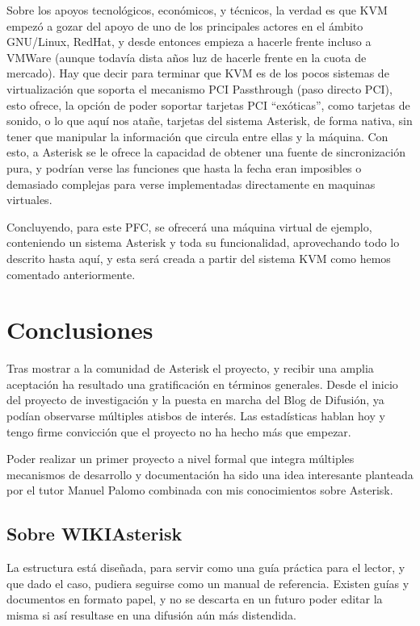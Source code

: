 Sobre los apoyos tecnológicos, económicos, y técnicos, la verdad es que KVM empezó a gozar del apoyo de uno de los principales actores en el ámbito GNU/Linux, RedHat, y desde entonces empieza a hacerle frente incluso a VMWare (aunque todavía dista años luz de hacerle frente en la cuota de mercado). Hay que decir para terminar que KVM es de los pocos sistemas de virtualización que soporta el mecanismo PCI Passthrough (paso directo PCI), esto ofrece, la opción de poder soportar tarjetas PCI “exóticas”, como tarjetas de sonido, o lo que aquí nos atañe, tarjetas del sistema Asterisk, de forma nativa, sin tener que manipular la información que circula entre ellas y la máquina. Con esto, a Asterisk se le ofrece la capacidad de obtener una fuente de sincronización pura, y podrían verse las funciones que hasta la fecha eran imposibles o demasiado complejas para verse implementadas directamente en maquinas virtuales.

Concluyendo, para este PFC, se ofrecerá una máquina virtual de ejemplo, conteniendo un sistema Asterisk y toda su funcionalidad, aprovechando todo lo descrito hasta aquí, y esta será creada a partir del sistema KVM como hemos comentado anteriormente.

\section{Conclusiones}

Tras mostrar a la comunidad de Asterisk el proyecto, y recibir una amplia aceptación ha resultado una gratificación en términos generales. Desde el inicio del proyecto de investigación y la puesta en marcha del Blog de Difusión, ya podían observarse múltiples atisbos de interés. Las estadísticas hablan hoy y tengo firme convicción que el proyecto no ha hecho más que empezar.

Poder realizar un primer proyecto a nivel formal que integra múltiples mecanismos de desarrollo y documentación ha sido una idea interesante planteada por el tutor Manuel Palomo combinada con mis conocimientos sobre Asterisk.

\subsection{Sobre WIKIAsterisk}

La estructura está diseñada, para servir como una guía práctica para el lector, y que dado el caso, pudiera seguirse como un manual de referencia. Existen guías y documentos en formato papel, y no se descarta en un futuro poder editar la misma si así resultase en una difusión aún más distendida.

